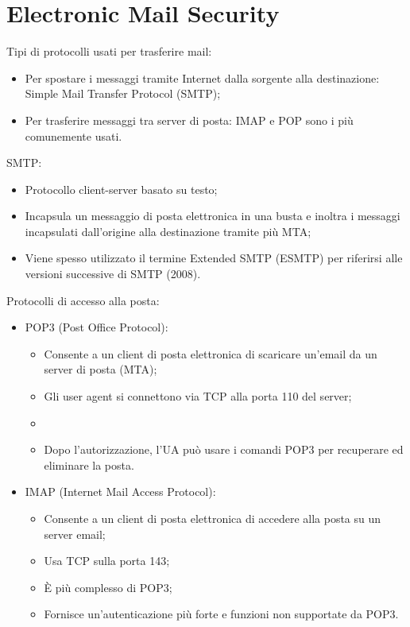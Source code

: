 \setchapterpreamble[u]{\margintoc}
\chapter{Electronic Mail Security}


Tipi di protocolli usati per trasferire mail:
\begin{itemize}
    \item Per spostare i messaggi tramite Internet dalla sorgente alla destinazione: Simple Mail Transfer Protocol (SMTP);
	\item Per trasferire messaggi tra server di posta: IMAP e POP sono i più comunemente usati.
\end{itemize}

SMTP:
\begin{itemize}
    \item Protocollo client-server basato su testo;
	\item Incapsula un messaggio di posta elettronica in una busta e inoltra i messaggi incapsulati dall'origine alla destinazione tramite più MTA;
	\item Viene spesso utilizzato il termine Extended SMTP (ESMTP) per riferirsi alle versioni successive di SMTP (2008).
\end{itemize}

Protocolli di accesso alla posta:
\begin{itemize}
    \item POP3 (Post Office Protocol): 
	\begin{itemize}
	    \item Consente a un client di posta elettronica di scaricare un'email da un server di posta (MTA);
		\item Gli user agent si connettono via TCP alla porta 110 del server;
		\item \item Dopo l'autorizzazione, l'UA può usare i comandi POP3 per recuperare ed eliminare la posta.
	\end{itemize}
	\item IMAP (Internet Mail Access Protocol):
	\begin{itemize}
	    \item Consente a un client di posta elettronica di accedere alla posta su un server email;
		\item Usa TCP sulla porta 143;
		\item È più complesso di POP3;
		\item Fornisce un'autenticazione più forte e funzioni non supportate da POP3.
	\end{itemize}
\end{itemize}

